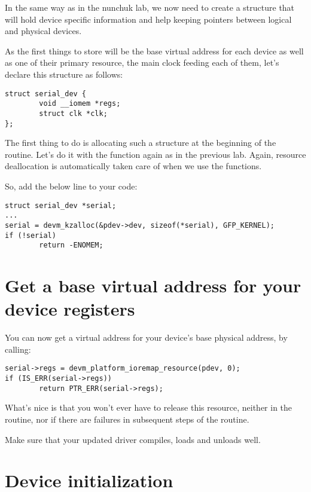 In the same way as in the nunchuk lab, we now need to create a
structure that will hold device specific information and help
keeping pointers between logical and physical devices.

As the first things to store will be the base virtual address for
each device as well as one of their primary resource, the main clock feeding
each of them, let's declare this structure as follows:

\begin{verbatim}
struct serial_dev {
        void __iomem *regs;
        struct clk *clk;
};
\end{verbatim}

The first thing to do is allocating such a structure at the beginning
of the  routine. Let's do it with the 
function again as in the previous lab. Again, resource deallocation is
automatically taken care of when we use the  functions.

So, add the below line to your code:

\begin{verbatim}
struct serial_dev *serial;
...
serial = devm_kzalloc(&pdev->dev, sizeof(*serial), GFP_KERNEL);
if (!serial)
        return -ENOMEM;
\end{verbatim}

\section{Get a base virtual address for your device registers}

You can now get a virtual address for your device's base physical
address, by calling:

\begin{verbatim}
serial->regs = devm_platform_ioremap_resource(pdev, 0);
if (IS_ERR(serial->regs))
        return PTR_ERR(serial->regs);
\end{verbatim}

What's nice is that you won't ever have to release this resource,
neither in the  routine, nor if there are failures
in subsequent steps of the  routine.

Make sure that your updated driver compiles, loads and unloads well.

\section{Device initialization}

